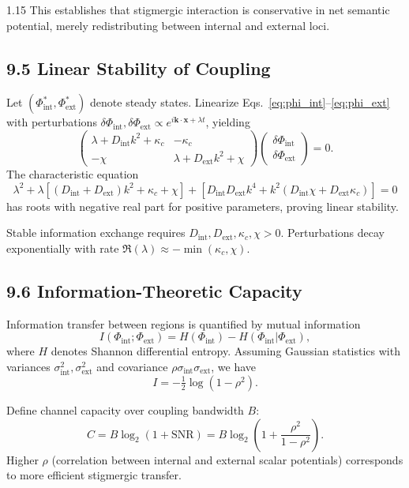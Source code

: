 \documentclass[12pt,a4paper]{article}
\begin{document}
\begin{spacing}{1.15}
This establishes that stigmergic interaction is conservative in net semantic potential, merely redistributing between internal and external loci.

\subsection{9.5 Linear Stability of Coupling}

Let $(\Phi_{\mathrm{int}}^\ast,\Phi_{\mathrm{ext}}^\ast)$ denote steady states.  
Linearize Eqs.~\eqref{eq:phi_int}–\eqref{eq:phi_ext} with perturbations $\delta\Phi_{\mathrm{int}},\delta\Phi_{\mathrm{ext}}\propto e^{i\mathbf{k}\cdot\mathbf{x}+\lambda t}$, yielding
\[
\begin{pmatrix}
\lambda+D_{\mathrm{int}}k^2+\kappa_c & -\kappa_c\\
-\chi & \lambda+D_{\mathrm{ext}}k^2+\chi
\end{pmatrix}
\begin{pmatrix}\delta\Phi_{\mathrm{int}}\\\delta\Phi_{\mathrm{ext}}\end{pmatrix}=0.
\]
The characteristic equation
\[
\lambda^2 + \lambda[(D_{\mathrm{int}}+D_{\mathrm{ext}})k^2+\kappa_c+\chi]
+ [D_{\mathrm{int}}D_{\mathrm{ext}}k^4 + k^2(D_{\mathrm{int}}\chi+D_{\mathrm{ext}}\kappa_c)]
=0
\]
has roots with negative real part for positive parameters, proving linear stability.

\begin{corollary}
Stable information exchange requires $D_{\mathrm{int}},D_{\mathrm{ext}},\kappa_c,\chi>0$.  
Perturbations decay exponentially with rate  
$\Re(\lambda)\approx -\min(\kappa_c,\chi)$.
\end{corollary}

\subsection{9.6 Information-Theoretic Capacity}

Information transfer between regions is quantified by mutual information
\[
I(\Phi_{\mathrm{int}};\Phi_{\mathrm{ext}})
 = H(\Phi_{\mathrm{int}}) - H(\Phi_{\mathrm{int}}|\Phi_{\mathrm{ext}}),
\]
where $H$ denotes Shannon differential entropy.  
Assuming Gaussian statistics with variances $\sigma_{\mathrm{int}}^2,\sigma_{\mathrm{ext}}^2$ and covariance $\rho\sigma_{\mathrm{int}}\sigma_{\mathrm{ext}}$, we have
\[
I = -\tfrac{1}{2}\log(1-\rho^2).
\]

Define channel capacity over coupling bandwidth $B$:
\[
C = B \log_2(1+\mathrm{SNR})
   = B\log_2\!\left(1+\frac{\rho^2}{1-\rho^2}\right).
\]
Higher $\rho$ (correlation between internal and external scalar potentials) corresponds to more efficient stigmergic transfer.


\end{spacing}
\end{document}
